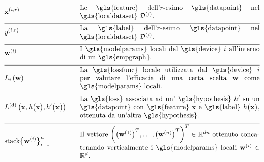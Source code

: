 \begin{align} 
		&\featurevec^{(\nodeidx,\sampleidx)} & \quad & \parbox{.75\textwidth}{Le \gls{feature} dell'$\sampleidx$-esimo \gls{datapoint} nel \gls{localdataset} $\localdataset{\nodeidx}$.} \nonumber \\[2mm] \hline \nonumber\\[-5mm]
	&\truelabel^{(\nodeidx,\sampleidx)} & \quad & \parbox{.75\textwidth}{La \gls{label} dell'$\sampleidx$-esimo \gls{datapoint} nel \gls{localdataset} $\localdataset{\nodeidx}$.} \nonumber \\[2mm] \hline \nonumber\\[-5mm]
		&\localparams{\nodeidx} & \quad & \parbox{.75\textwidth}{I \gls{modelparams} locali del \gls{device} $\nodeidx$ all'interno di un \gls{empgraph}.} \nonumber \\[2mm] \hline \nonumber\\[-5mm]
		&\locallossfunc{\nodeidx}{\weights} & \quad & \parbox{.75\textwidth}{La \gls{lossfunc} locale utilizzata dal \gls{device} $\nodeidx$ 
		per valutare l'efficacia di una certa scelta $\weights$ come \gls{modelparams} locali.}\nonumber \\[2mm] \hline \nonumber\\[-5mm]
	& \gtvloss{\featurevec}{\hypothesis\big(\featurevec\big)}{\hypothesis'\big(\featurevec\big)}& \quad & \parbox{.75\textwidth}{La \gls{loss} 
		associata ad un' \gls{hypothesis} $\hypothesis'$ su un \gls{datapoint} con \gls{feature} $\featurevec$ e \gls{label} 
		$\hypothesis\big( \featurevec\big)$, ottenuta da un'altra \gls{hypothesis}.}\nonumber \\[2mm] \hline \nonumber\\[-5mm]
		& 	{\rm stack} \big\{ \weights^{(\nodeidx)} \big\}_{\nodeidx=1}^{\nrnodes} & \quad & \parbox{.75\textwidth}{Il vettore $\bigg( \big(\weights^{(1)}  \big)^{T}, \ldots, \big(\weights^{(\nrnodes)}  \big)^{T} \bigg)^{T} \in \mathbb{R}^{\dimlocalmodel\nrnodes}$ ottenuto concatenando verticalmente i \gls{modelparams} locali $\weights^{(\nodeidx)} \in \mathbb{R}^{\dimlocalmodel}$.} \nonumber  
\end{align}        


